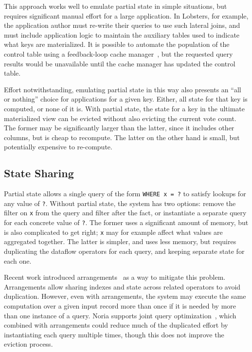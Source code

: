 This approach works well to emulate partial state in simple situations, but
requires significant manual effort for a large application. In Lobsters, for
example, the application author must re-write their queries to use such lateral
joins, and must include application logic to maintain the auxiliary tables used
to indicate what keys are materialized. It is possible to automate the
population of the control table using a feedback-loop cache
manager~\cite{dynamic-materialized-views}, but the requested query results would
be unavailable until the cache manager has updated the control table.

Effort notwithstanding, emulating partial state in this way also presents an
``all or nothing'' choice for applications for a given key. Either, all state
for that key is computed, or none of it is. With partial state, the state for a
key in the ultimate materialized view can be evicted without also evicting the
current vote count. The former may be significantly larger than the latter,
since it includes other columns, but is cheap to recompute. The latter on the
other hand is small, but potentially expensive to re-compute.

\subsection{State Sharing}

Partial state allows a single query of the form \texttt{WHERE x = ?} to satisfy
lookups for any value of \texttt{?}. Without partial state, the system has two
options: remove the filter on \texttt{x} from the query and filter after the
fact, or instantiate a separate query for each concrete value of \texttt{?}. The
former uses a significant amount of memory, but is also complicated to get
right; \texttt{x} may for example affect what values are aggregated together.
The latter is simpler, and uses less memory, but requires duplicating the
dataflow operators for each query, and keeping separate state for each one.

Recent work introduced arrangements~\cite{arrangements} as a way to mitigate
this problem. Arrangements allow sharing indexes and state across related
operators to avoid duplication. However, even with arrangements, the system may
execute the same computation over a given input record more than once if it is
needed by more than one instance of a query. Noria supports joint query
optimization~\cite{noria}, which combined with arrangements could reduce much of
the duplicated effort by instantiating each query multiple times, though this
does not improve the eviction process.

